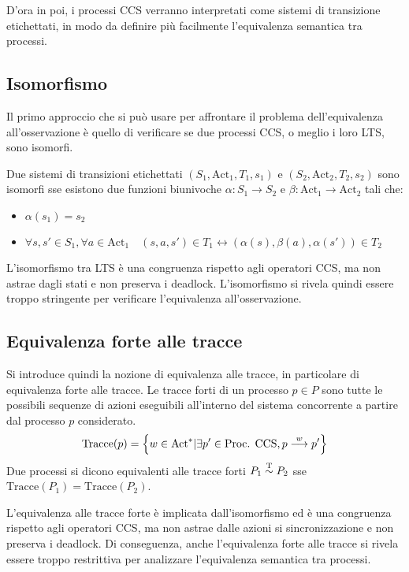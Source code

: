 D'ora in poi, i processi CCS verranno interpretati come sistemi di transizione
etichettati, in modo da definire più facilmente l'equivalenza semantica
tra processi.

\subsection*{Isomorfismo}
Il primo approccio che si può usare per affrontare il problema dell'equivalenza
all'osservazione è quello di verificare se due processi CCS, o meglio i loro
LTS, sono isomorfi.

Due sistemi di transizioni etichettati $(S_1, \text{Act}_1, T_1, s_1)$ e
$(S_2, \text{Act}_2, T_2, s_2)$ sono isomorfi sse esistono due funzioni biunivoche
$\alpha: S_1 \rightarrow S_2$ e $\beta: \text{Act}_1 \rightarrow \text{Act}_2$
tali che:
\begin{itemize}
    \item $\alpha(s_1) = s_2$
    \item $\forall s,s' \in S_1, \forall a \in \text{Act}_1 \quad
    (s,a,s') \in T_1 \leftrightarrow (\alpha (s), \beta (a), \alpha (s')) \in T_2$
\end{itemize}

L'isomorfismo tra LTS è una congruenza rispetto agli operatori CCS, ma
non astrae dagli stati e non preserva i deadlock. L'isomorfismo si rivela
quindi essere troppo stringente per verificare l'equivalenza
all'osservazione.

\subsection*{Equivalenza forte alle tracce}
Si introduce quindi la nozione di equivalenza alle tracce, in particolare
di equivalenza forte alle tracce.
Le tracce forti di un processo $p \in P$ sono tutte le possibili sequenze
di azioni eseguibili all'interno del sistema concorrente a partire dal processo
$p$ considerato.
\[
    \text{Tracce}(p) = \left\{w \in \text{Act}^* |
    \exists p' \in \text{Proc. CCS}, p \overset{w}{\longrightarrow} p'\right\}
\]
Due processi si dicono equivalenti alle tracce forti $P_1 \overset{\textnormal{T}}{\sim} P_2$ sse
$\text{Tracce}(P_1) = \text{Tracce}(P_2)$.

L'equivalenza alle tracce forte è implicata dall'isomorfismo ed è una congruenza
rispetto agli operatori CCS, ma non astrae dalle azioni si sincronizzazione
e non preserva i deadlock. Di conseguenza, anche l'equivalenza forte
alle tracce si rivela essere troppo restrittiva per analizzare l'equivalenza
semantica tra processi.

